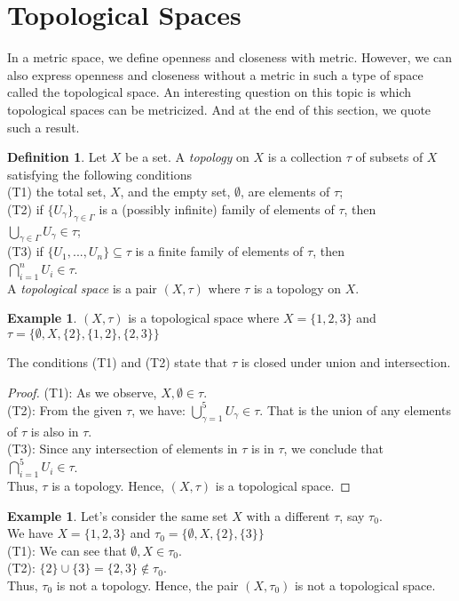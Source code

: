 \documentclass[12pt, reqno]{amsart}
\theoremstyle{definition}
\newtheorem{definition}[theorem]{Definition}
\newtheorem{example}[theorem]{Example}
\numberwithin{equation}{section}
\begin{document}
\section{Topological Spaces}
In a metric space, we define openness and closeness with metric. However, we can also express openness and closeness without a metric in such a type of space called the topological space. An interesting question on this topic is which topological spaces can be metricized. And at the end of this section, we quote such a result.
\begin{definition} \cite{s2} \label{topology def}
    Let $X$ be a set. A \textit{topology} on $X$ is a collection $\tau$ of subsets of $X$ satisfying the following conditions\\
    (T1) the total set, $X$, and the empty set, $\emptyset$, are elements of $\tau$;\\
    (T2) if $\{U_\gamma\}_{\gamma \in \Gamma}$ is a (possibly infinite) family of elements of $\tau$, then\\
    \hspace*{6.5cm} $\bigcup_{\gamma \in \Gamma}U_\gamma \in \tau$;\\
    (T3) if $\{U_1,...,U_n\} \subseteq \tau$ is a finite family of elements of $\tau$, then\\
    \hspace*{6.5cm} $\bigcap_{i=1}^n U_i \in \tau$.\\
    A \textit{topological space} is a pair $(X, \tau)$ where $\tau$ is a topology on $X$.
\end{definition}
\pagebreak
\begin{example}
$(X, \tau)$ is a topological space where $X =\{1,2,3\}$ and $\tau = \{\emptyset, X, \{2\}, \{1,2\}, \{2,3\}\}$
\end{example}
The conditions (T1) and (T2) state that $\tau$ is closed under union and intersection.
\begin{proof}
(T1): As we observe, $X, \emptyset \in \tau$.\\
(T2): From the given $\tau$, we have: $\bigcup_{\gamma=1}^{5}U_\gamma \in \tau$. That is the union of any elements of $\tau$ is also in $\tau$.\\
(T3): Since any intersection of elements in $\tau$ is in $\tau$, we conclude that $\bigcap_{i=1}^5 U_i \in \tau$.\\
Thus, $\tau$ is a topology. Hence, $(X, \tau)$ is a topological space.
\end{proof}
\begin{example}
Let's consider the same set $X$ with a different $\tau$, say $\tau_0$.\\
We have $X=\{1,2,3\}$ and $\tau_0=\{\emptyset, X, \{2\}, \{3\}\}$\\
(T1): We can see that $\emptyset, X \in \tau_0$.\\
(T2): $\{2\} \cup \{3\} = \{2,3\} \notin \tau_0$.\\
Thus, $\tau_0$ is not a topology. Hence, the pair $(X, \tau_0)$ is not a topological space.
\end{example}
\end{document}
